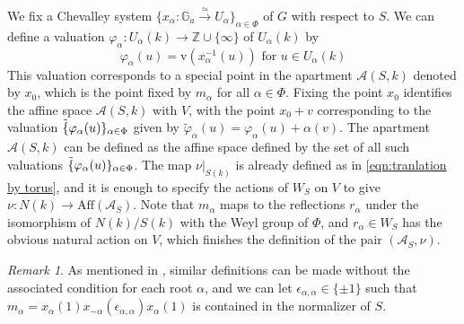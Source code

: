 \documentclass[11 pt]{article}
\numberwithin{equation}{subsection}
\theoremstyle{definition}
\theoremstyle{remark}
\newtheorem{remark}[theorem]{Remark}
\theoremstyle{conjecture}
\newcommand{\rv}{\mathrm{v}}
\newcommand{\Z}{\mathbb Z}
\newcommand{\A}{\mathcal A}
\newcommand{\G}{\mathbb G}
\begin{document}
We fix a Chevalley system $\{x_\alpha:\G_a \xrightarrow{\simeq} U_\alpha\}_{\alpha\in \Phi}$ of $G$ with respect to $S$. We can define a valuation $\varphi_\alpha: U_\alpha(k) \rightarrow \Z \cup \{\infty\}$ of $U_\alpha(k)$ by 
\begin{equation*}
    \varphi_\alpha (u)= \rv(x_\alpha^{-1}(u)) \text{ for } u \in U_\alpha(k)
\end{equation*}
This valuation corresponds to a special point in the apartment $\A(S,k)$ denoted by $x_0$, which is the point fixed by $m_\alpha$ for all $\alpha\in \Phi$. Fixing the point $x_0$ identifies the affine space $\A(S,k)$ with $V$, with the point $x_0+v$ corresponding to the valuation $\tilde \{\varphi_\alpha(u)\}_{\alpha \in \Phi}$ given by $\tilde\varphi_\alpha(u)= \varphi_{\alpha}(u)+\alpha(v)$. The apartment $\A(S,k)$ can be defined as the affine space defined by the set of all such valuations $\tilde \{\varphi_\alpha(u)\}_{\alpha \in \Phi}$. The map $\nu|_{S(k)}$ is already defined as in \eqref{eqn:tranlation by torus}, and it is enough to specify the actions of $W_S$ on $V$ to give $\nu:N(k) \rightarrow \mathrm{Aff}(\A_S)$. Note that $m_\alpha$ maps to the reflections $r_\alpha$ under the isomorphism of $N(k)/S(k)$ with the Weyl group of $\Phi$, and $r_\alpha\in W_S$ has the obvious natural action on $V$, which finishes the definition of the pair $(\A_S,\nu)$.
\begin{remark}
    As mentioned in \cite[Remark 2.1.1]{fintzenmoyprasad}, similar definitions can be made without the associated condition for each root $\alpha$, and we can let $\epsilon_{\alpha,\alpha}\in \{\pm1\}$ such that $m_\alpha= x_\alpha(1)x_{-\alpha}(\epsilon_{\alpha,\alpha})x_\alpha(1)$ is contained in the normalizer of $S$. 
\end{remark}
\end{document}
